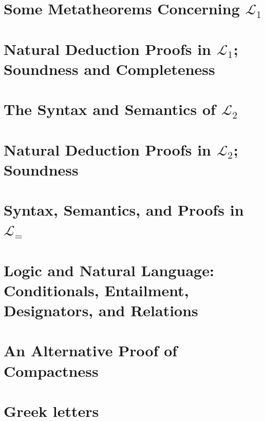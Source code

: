 \documentclass[openany,leqno,11pt]{book}
\theoremstyle{break}
\theoremstyle{definition}
\theoremstyle{remark}
\newcommand{\lone}{\ensuremath{\mathcal{L}_{1}}}
\newcommand{\ltwo}{\ensuremath{\mathcal{L}_{2}}}
\begin{document}
\chapter{Some Metatheorems Concerning $\mathcal{L}_{1}$}\label{c4}
 

\newpage

\chapter[Natural Deduction in \lone]{Natural Deduction Proofs in $\mathcal{L}_{1}$; Soundness and Completeness}\label{c5}
  

\newpage

\chapter{The Syntax and Semantics of $\mathcal{L}_{2}$}\label{c6}
 

\newpage

\chapter[Natural Deduction in \ltwo]{Natural Deduction Proofs in \ltwo; Soundness}\label{c7}
 

\chapter{Syntax, Semantics, and Proofs in $\mathcal{L}_{=}$}\label{c8}
 


\newpage
\chapter[Logic and Natural Language]{Logic and Natural Language: Conditionals, Entailment, Designators, and Relations}\label{c9}



\appendix

\chapter[Alternative Proof of Compactness]{An Alternative Proof of Compactness}\label{altcomp}





\chapter{Greek letters}\label{greek}
\end{document}
